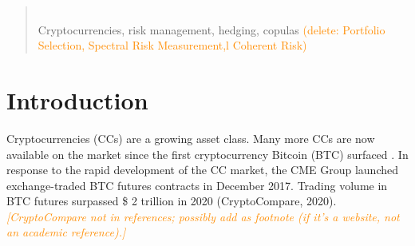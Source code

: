 \documentclass[11pt,a4paper,english]{article}
\providecommand{\natp}[1]{\textcolor{darkorange}{#1}}
\begin{document}
\begin{abstract}
{  \\
 Cryptocurrencies, risk management, hedging,
copulas \natp{(delete: Portfolio Selection, Spectral Risk Measurement,l Coherent Risk)}}
\pagestyle{empty}
\end{abstract}





\clearpage
\section{Introduction}\label{sec:introduction}
Cryptocurrencies (CCs) are a growing asset class.
Many more CCs are now available on the market since the first
cryptocurrency Bitcoin (BTC) surfaced \citep{nakamoto2009}.
In response to the rapid development of the CC market, the CME Group
launched exchange-traded BTC futures contracts in December
2017. Trading volume in BTC futures surpassed \$ 2 trillion in 2020
(CryptoCompare, 2020). \natp{\em[CryptoCompare not in references;
  possibly add as footnote (if it's a website, not an academic
  reference).]} 
\end{document}
